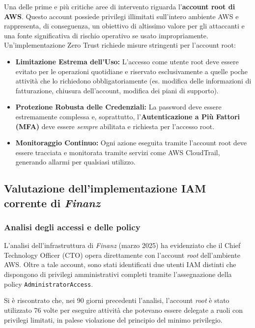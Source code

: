 Una delle prime e più critiche aree di intervento riguarda l'\textbf{account root di AWS}. Questo account possiede privilegi illimitati sull'intero ambiente AWS e rappresenta, di conseguenza, un obiettivo di altissimo valore per gli attaccanti e una fonte significativa di rischio operativo se usato impropriamente. Un'implementazione Zero Trust richiede misure stringenti per l'account root:
\begin{itemize}
    \item \textbf{Limitazione Estrema dell'Uso:} L'accesso come utente root deve essere evitato per le operazioni quotidiane e riservato esclusivamente a quelle poche attività che lo richiedono obbligatoriamente (es. modifica delle informazioni di fatturazione, chiusura dell'account, modifica dei piani di supporto).
    \item \textbf{Protezione Robusta delle Credenziali:} La password deve essere estremamente complessa e, soprattutto, l'\textbf{Auten\-ticazione a Più Fattori (MFA)} deve essere \textit{sempre} abilitata e richiesta per l'accesso root.
    \item \textbf{Monitoraggio Continuo:} Ogni azione eseguita tramite l'account root deve essere tracciata e monitorata tramite servizi come AWS CloudTrail, generando allarmi per qualsiasi utilizzo.
\end{itemize}


\subsection{Valutazione dell'implementazione IAM corrente di \emph{Finanz}}
\label{subsec:analisi_iam_finanz}

\subsubsection*{Analisi degli accessi e delle policy}
L'analisi dell'infrastruttura di \emph{Finanz} (marzo 2025) ha evidenziato che il Chief Technology Officer (CTO) opera direttamente con l'account \emph{root} dell'ambiente AWS. Oltre a tale account, sono stati identificati due utenti IAM distinti che dispongono di privilegi amministrativi completi tramite l'assegnazione della policy \texttt{AdministratorAccess}.

Si è riscontrato che, nei 90 giorni precedenti l'analisi, l'account \emph{root} è stato utilizzato 76 volte per eseguire attività che potevano essere delegate a ruoli con privilegi limitati, in palese violazione del principio del minimo privilegio.

